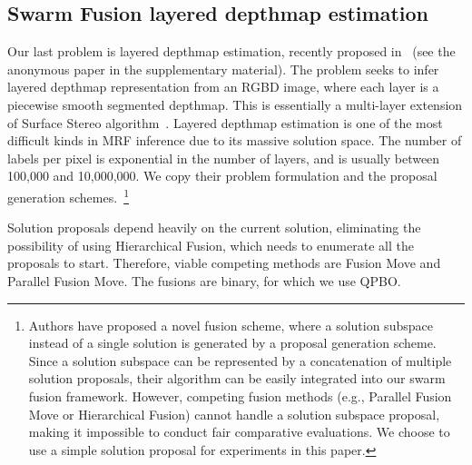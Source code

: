 \subsection{Swarm Fusion layered depthmap estimation}

Our last problem is layered depthmap estimation, recently proposed
in~\cite{layered_depthmap} (see the anonymous paper in the
supplementary material).  The problem seeks to infer layered depthmap
representation from an RGBD image, where each layer is a piecewise
smooth segmented depthmap. This is essentially a multi-layer extension
of Surface Stereo algorithm~\cite{surface_stereo}.
%
Layered depthmap estimation is one of the most difficult kinds in MRF
inference due to its massive solution space. The number of labels per
pixel is exponential in the number of layers, and is usually between 100,000 and 10,000,000. We copy their problem
formulation and the proposal generation schemes.~\footnote{Authors have
proposed a novel fusion scheme, where a solution subspace instead of a
single solution is generated by a proposal generation scheme. Since a
solution subspace can be represented by a concatenation of multiple solution proposals,
their algorithm can be easily integrated into our swarm fusion framework.
However, competing fusion methods (e.g., Parallel Fusion Move or
Hierarchical Fusion) cannot handle a solution subspace proposal, making
it impossible to conduct fair comparative evaluations. We choose to use
a simple solution proposal for experiments in this paper.}


\noindent Solution proposals depend heavily on the current solution,
eliminating the possibility of using Hierarchical Fusion, which needs to
enumerate all the proposals to start. Therefore, viable competing
methods are Fusion Move and Parallel Fusion Move.
%
%
The fusions are binary, for which we use QPBO.

